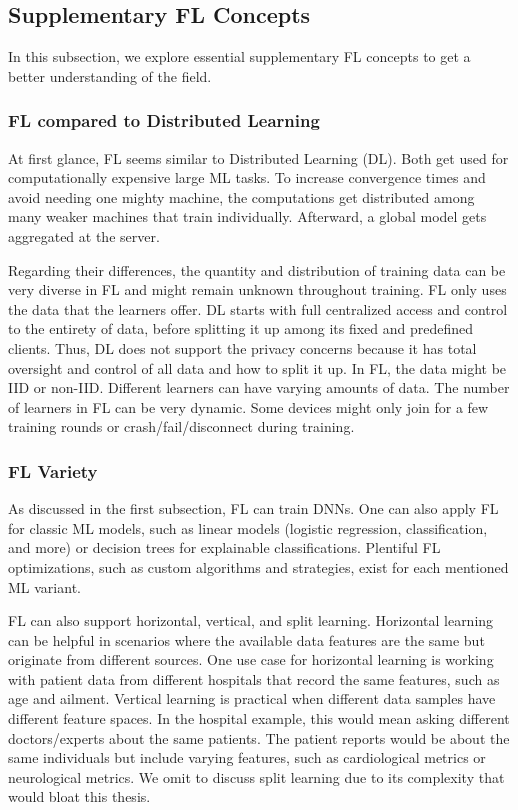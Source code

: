 \subsection{Supplementary FL Concepts}

In this subsection, we explore essential supplementary FL concepts
to get a better understanding of the field.

\subsubsection{FL compared to Distributed Learning}

At first glance, FL seems similar to Distributed Learning (DL).
Both get used for computationally expensive large ML tasks.
To increase convergence times and avoid needing one mighty machine,
the computations get distributed among many weaker machines that train individually.
Afterward, a global model gets aggregated
at the server.

Regarding their differences,
the quantity and distribution of training data can be very diverse in FL
and might remain unknown throughout training.
FL only uses the data that the learners offer. 
DL starts with full centralized access and control to the entirety of data,
before splitting it up among its fixed and predefined clients.
Thus, DL does not support the privacy concerns because it has total
oversight and control of all data and how to split it up.
In FL, the data might be IID or non-IID.
Different learners can have varying amounts of data.
The number of learners in FL can be very dynamic.
Some devices might only join for a few training rounds
or crash/fail/disconnect during training.

\subsubsection{FL Variety}

As discussed in the first subsection, FL can train DNNs.
One can also apply FL for classic ML models, such as
linear models (logistic regression, classification, and more) or
decision trees for explainable classifications.
Plentiful FL optimizations, such as custom algorithms and strategies,
exist for each mentioned ML variant.

FL can also support horizontal, vertical, and split learning.
Horizontal learning can be helpful in scenarios where the available data features are the same but
originate from different sources.
One use case for horizontal learning is working with
patient data from different hospitals that record the same features,
such as age and ailment.
Vertical learning is practical when different data samples have
different feature spaces.
In the hospital example, this would mean asking different doctors/experts
about the same patients. 
The patient reports would be about the same individuals but include varying features,
such as cardiological metrics or neurological metrics.
We omit to discuss split learning due to its complexity that would bloat this thesis.

